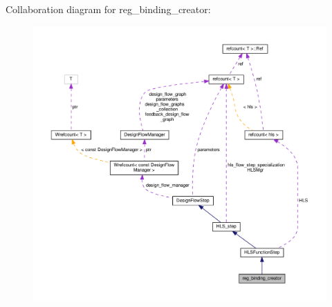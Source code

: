 Collaboration diagram for reg\+\_\+binding\+\_\+creator\+:
\nopagebreak
\begin{figure}[H]
\begin{center}
\leavevmode
\includegraphics[width=350pt]{d1/d80/classreg__binding__creator__coll__graph}
\end{center}
\end{figure}
